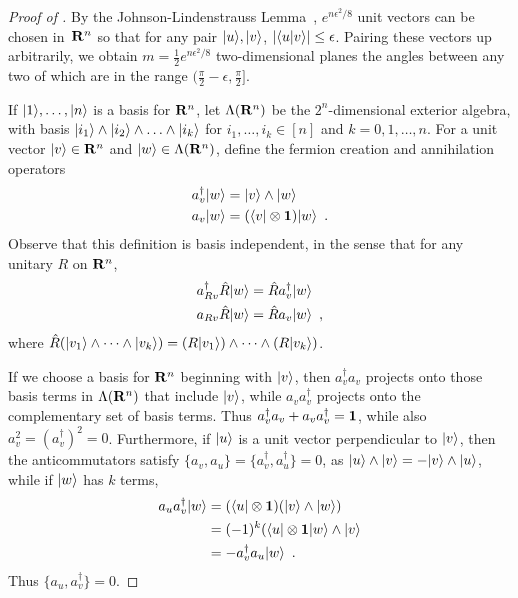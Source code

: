 \documentclass[preprintnumbers,11pt,onecolumn]{article}
\begin{document}
\begin{proof}[Proof of ]
By the Johnson-Lindenstrauss Lemma~\cite{JohnsonLindenstrauss84, DasguptaGupta03JohnsonLindenstrauss}, $e^{n \epsilon^2 / 8}$ unit vectors can be chosen in~${\bf R}^n$ so that for any pair ${|u\rangle}, {|v\rangle}$, ${\lvert {\langle u|v\rangle}\rvert} \leq \epsilon$.  Pairing these vectors up arbitrarily, we obtain $m = \tfrac12 e^{n \epsilon^2 / 8}$ two-dimensional planes the angles between any two of which are in the range $(\tfrac\pi2 - \epsilon, \tfrac\pi2]$.  

If ${|1\rangle}, \ldots, {|n\rangle}$ is a basis for ${\bf R}^n$, let $\Lambda({\bf R}^n)$ be the $2^n$-dimensional exterior algebra, with basis ${|i_1\rangle} \wedge {|i_2\rangle} \wedge \ldots \wedge {|i_k\rangle}$ for $i_1, \ldots, i_k \in [n]$ and $k = 0, 1, \ldots, n$.  For a unit vector ${|v\rangle} \in {\bf R}^n$ and ${|w\rangle} \in \Lambda({\bf R}^n)$, define the fermion creation and annihilation operators 
\begin{equation*}\begin{split}
a_v^\dagger {|w\rangle} &= {|v\rangle} \wedge {|w\rangle} \\
a_v {|w\rangle} &= ({\langle v|} \otimes \boldsymbol{1}) {|w\rangle}
 \enspace .
\end{split}\end{equation*}
Observe that this definition is basis independent, in the sense that for any unitary $R$ on ${\bf R}^n$, 
\begin{equation*}\begin{split}
a_{R v}^\dagger \hat R {|w\rangle} &= \hat R a_v^\dagger {|w\rangle} \\
a_{R v} \hat R {|w\rangle} &= \hat R a_v {|w\rangle}
 \enspace ,
\end{split}\end{equation*}
where $\hat R ({|v_1\rangle} \wedge \cdots \wedge {|v_k\rangle}) = (R {|v_1\rangle}) \wedge \cdots \wedge (R {|v_k\rangle})$.  

If we choose a basis for ${\bf R}^n$ beginning with ${|v\rangle}$, then $a_v^\dagger a_v$ projects onto those basis terms in $\Lambda({\bf R}^n)$ that include ${|v\rangle}$, while $a_v a_v^\dagger$ projects onto the complementary set of basis terms.  Thus $a_v^\dagger a_v + a_v a_v^\dagger = \boldsymbol{1}$, while also $a_v^2 = (a_v^\dagger)^2 = 0$.  Furthermore, if ${|u\rangle}$ is a unit vector perpendicular to ${|v\rangle}$, then the anticommutators satisfy $\{a_v, a_u\} = \{a_v^\dagger, a_u^\dagger\} = 0$, as ${|u\rangle} \wedge {|v\rangle} = - {|v\rangle} \wedge {|u\rangle}$, while if ${|w\rangle}$ has $k$ terms, 
\begin{align*}
a_u a_v^\dagger {|w\rangle} 
&= ({\langle u|} \otimes \boldsymbol{1})({|v\rangle} \wedge {|w\rangle}) \\
&= (-1)^k ({\langle u|} \otimes \boldsymbol{1} {|w\rangle} \wedge {|v\rangle} \\
&= -a_v^\dagger a_u {|w\rangle}
 \enspace .
\end{align*}
Thus $\{a_u, a_v^\dagger\} = 0$.  


\end{proof}
\end{document}
